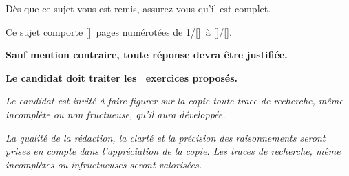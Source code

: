 {{\begin{center}

      \vspace*{20mm}
      
      Dès que ce sujet vous est remis, assurez-vous qu’il est complet.
      
      \smallskip
      
      Ce sujet comporte [\packlastpage]\ pages numérotées de 1/[\packlastpage]\ à [\packlastpage]/[\packlastpage].
    \end{center}
    \begin{center}
      \parbox{\useKV[EnteteSujetBacEAM]{LargeurPar}}{%
        {%
          \vspace*{10mm}
          
          \noindent\textbf{Sauf mention contraire, toute réponse devra être justifiée.}
        }%
        {}%
        {%
          \vspace*{5mm}
          
          \noindent\textbf{Le candidat doit traiter les \ exercices proposés.}
        }%
        {}%
        {%
          \vspace*{10mm}
          
          \noindent\textit{Le candidat est invité à faire figurer sur la copie toute trace de recherche, même incomplète ou non fructueuse, qu’il aura développée.}
        }%
        {}%
        {%
          \vspace*{2mm}
          
          \noindent\textit{La qualité de la rédaction, la clarté et la précision des raisonnements seront prises en compte dans l’appréciation de la copie. Les traces de recherche, même incomplètes ou infructueuses seront valorisées.}
        }%
        {}%
      }%
    \end{center}%
  }%
  \pagebreak
}

\endinput